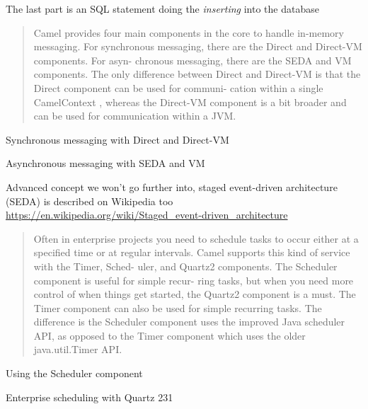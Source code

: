 \documentclass[Screen16to9,17pt]{foils}
\begin{document}
The last part is an SQL statement doing the \emph{inserting} into the database


\begin{quote}
  Camel provides four main components in the core to handle in-­memory messaging.
For synchronous messaging, there are the Direct and Direct-­VM components. For asyn-
chronous messaging, there are the SEDA and VM components. The only difference
between Direct and Direct-­VM is that the Direct component can be used for communi-
cation within a single CamelContext , whereas the Direct-­VM component is a bit broader
and can be used for communication within a JVM.
\end{quote}

\begin{list2}
\item Synchronous messaging with Direct and Direct-­VM
\item Asynchronous messaging with SEDA and VM
\end{list2}

Advanced concept we won't go further into, staged event-­driven architecture (SEDA) is described on Wikipedia too \url{https://en.wikipedia.org/wiki/Staged_event-­driven_architecture}






\begin{quote}
  Often in enterprise projects you need to schedule tasks to occur either at a specified
  time or at regular intervals. Camel supports this kind of service with the Timer, Sched-
  uler, and Quartz2 components. The Scheduler component is useful for simple recur-
  ring tasks, but when you need more control of when things get started, the Quartz2
  component is a must. The Timer component can also be used for simple recurring
  tasks. The difference is the Scheduler component uses the improved Java scheduler
  API, as opposed to the Timer component which uses the older java.util.Timer API.
\end{quote}

\begin{list2}
\item Using the Scheduler component
\item Enterprise scheduling with Quartz 231
\end{list2}
\end{document}
